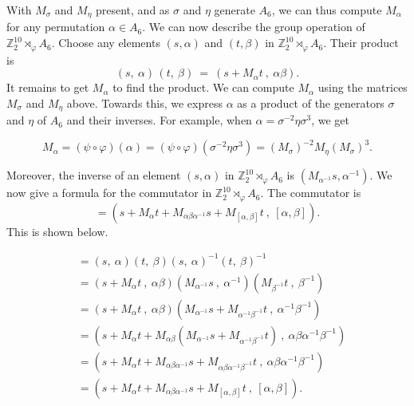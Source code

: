 \documentclass[11pt,twoside]{amsart}
\newcommand{\Z}{\mathbb{Z}}
\numberwithin{equation}{section}
\begin{document}
With $M_\sigma$ and $M_\eta$ present, and as $\sigma$ and $\eta$ generate $A_6$, we can thus compute $M_\alpha$ for any permutation $\alpha \in A_6$. We can now describe the group operation of $\Z_2^{10} \rtimes_\varphi A_6$. Choose any elements $(s,\alpha)$ and $(t,\beta)$ in $\mathbb{Z}_2^{10} \rtimes_\varphi A_6$. Their product is $$( s,\ \alpha )\,( t,\ \beta ) \ =\ ( s+M_{\alpha } t\ ,\ \alpha \beta ).$$ 
It remains to get $M_\alpha$ to find the product. We can compute $M_\alpha$ using the matrices $M_\sigma$ and $M_\eta$ above. Towards this, we express $\alpha$ as a product of the generators $\sigma$ and $\eta$ of $A_6$ and their inverses. For example, when $\alpha=\sigma^{-2}\eta\sigma^3$, we get

$$M_\alpha=(\psi\circ \varphi)(\alpha)=(\psi\circ \varphi)(\sigma^{-2}\eta\sigma^3)=(M_\sigma)^{-2} M_\eta (M_\sigma)^3.$$

Moreover, the inverse of an element $(s,\alpha)$ in $\mathbb{Z}_2^{10} \rtimes_\varphi A_6$ is $(M_{\alpha^{-1}}s, \alpha^{-1})$. We now give a formula for the commutator in $\mathbb{Z}_2^{10} \rtimes_\varphi A_6$. The commutator is  
\begin{equation}
[( s ,\ \alpha )\ ,\ ( t,\ \beta )]=(s+M_\alpha t+M_{\alpha\beta\alpha^{-1}}s+M_{[\alpha,\beta]}t\ ,\ [\alpha,\beta]).
\end{equation}
This is shown below. 

\begin{align*}
[( s,\ \alpha )\ ,\ ( t,\ \beta )] &= (s,\ \alpha )( t,\ \beta )( s,\ \alpha )^{-1} ( t,\ \beta )^{-1}   \nonumber\\
 &= (s+M_\alpha t\ ,\ \alpha\beta )( M_{\alpha^{-1}}s\ ,\ \alpha ^{-1}) ( M_{\beta^{-1}}t\ ,\ \beta ^{-1})   \nonumber\\
 &= (s+M_\alpha t\ ,\ \alpha\beta )( M_{\alpha^{-1}}s+M_{\alpha^{-1}\beta^{-1}}t\ ,\ \alpha ^{-1}\beta ^{-1})   \nonumber\\
 &= (s+M_\alpha t+M_{\alpha\beta}(M_{\alpha^{-1}}s+M_{\alpha^{-1}\beta^{-1}}t)\ ,\ \alpha\beta \alpha ^{-1}\beta ^{-1})   \nonumber\\
 &= (s+M_\alpha t+M_{\alpha\beta\alpha^{-1}}s+M_{\alpha\beta\alpha^{-1}\beta^{-1}}t\ ,\ \alpha\beta \alpha ^{-1}\beta ^{-1})   \nonumber\\
 &= (s+M_\alpha t+M_{\alpha\beta\alpha^{-1}}s+M_{[\alpha,\beta]}t\ ,\ [\alpha,\beta]).   
\end{align*}
\end{document}
